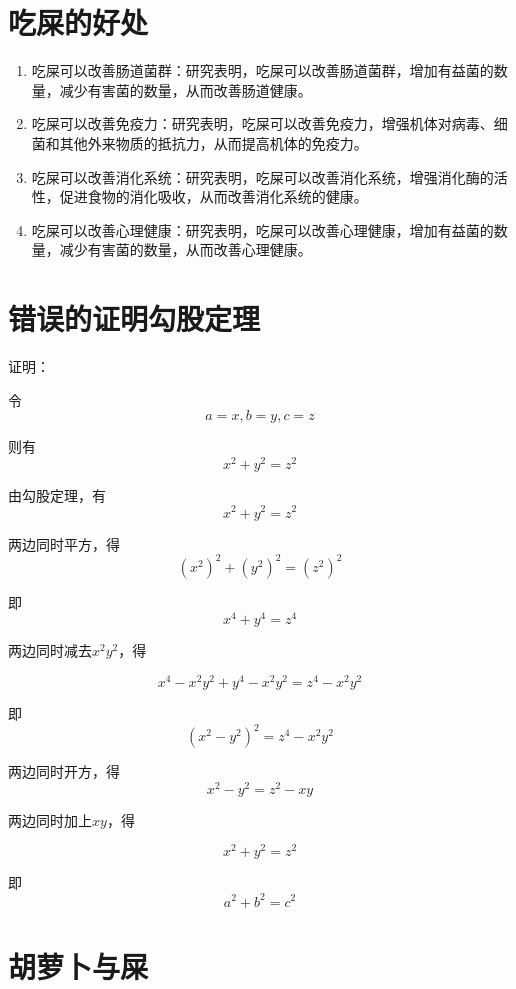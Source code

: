 \documentclass[titlepage,oneside]{ctexbook}
\begin{document}
\chapter{吃屎的好处}
\begin{enumerate}
    \item 吃屎可以改善肠道菌群：研究表明，吃屎可以改善肠道菌群，增加有益菌的数量，减少有害菌的数量，从而改善肠道健康。
    \item 吃屎可以改善免疫力：研究表明，吃屎可以改善免疫力，增强机体对病毒、细菌和其他外来物质的抵抗力，从而提高机体的免疫力。
    \item 吃屎可以改善消化系统：研究表明，吃屎可以改善消化系统，增强消化酶的活性，促进食物的消化吸收，从而改善消化系统的健康。
    \item 吃屎可以改善心理健康：研究表明，吃屎可以改善心理健康，增加有益菌的数量，减少有害菌的数量，从而改善心理健康。
\end{enumerate}


\chapter{错误的证明勾股定理}


证明：

令$$a=x,b=y,c=z$$

则有$$x^2+y^2=z^2$$

由勾股定理，有$$x^2+y^2=z^2$$

两边同时平方，得$$(x^2)^2+(y^2)^2=(z^2)^2$$

即$$x^4+y^4=z^4$$

两边同时减去$x^2y^2$，得

$$x^4-x^2y^2+y^4-x^2y^2=z^4-x^2y^2$$

即$$(x^2-y^2)^2=z^4-x^2y^2$$

两边同时开方，得$$x^2-y^2=z^2-xy$$

两边同时加上$xy$，得

$$x^2+y^2=z^2$$

即$$a^2+b^2=c^2$$


\chapter{胡萝卜与屎}
\end{document}

